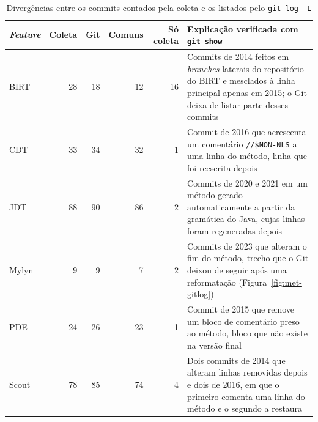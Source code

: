 \begin{table}[htbp]
    \centering
    \footnotesize
    \renewcommand{\arraystretch}{1.25}
    \caption{Divergências entre os commits contados pela coleta e os listados pelo \texttt{git log -L}}
    \label{tab:met-conferencia}
    \begin{tabularx}{\linewidth}{@{}lrrrr>{\raggedright\arraybackslash}X@{}}
        \toprule
        \textit{Feature} & Coleta & Git & Comuns & Só coleta & Explicação verificada com \texttt{git show} \\
        \midrule
        BIRT & 28 & 18 & 12 & 16 & Commits de 2014 feitos em \textit{branches} laterais do repositório do BIRT e mesclados à linha principal apenas em 2015; o Git deixa de listar parte desses commits \\
        CDT & 33 & 34 & 32 & 1 & Commit de 2016 que acrescenta um comentário \texttt{//\$NON-NLS} a uma linha do método, linha que foi reescrita depois \\
        JDT & 88 & 90 & 86 & 2 & Commits de 2020 e 2021 em um método gerado automaticamente a partir da gramática do Java, cujas linhas foram regeneradas depois \\
        Mylyn & 9 & 9 & 7 & 2 & Commits de 2023 que alteram o fim do método, trecho que o Git deixou de seguir após uma reformatação (Figura~\ref{fig:met-gitlog}) \\
        PDE & 24 & 26 & 23 & 1 & Commit de 2015 que remove um bloco de comentário preso ao método, bloco que não existe na versão final \\
        Scout & 78 & 85 & 74 & 4 & Dois commits de 2014 que alteram linhas removidas depois e dois de 2016, em que o primeiro comenta uma linha do método e o segundo a restaura \\
        \bottomrule
    \end{tabularx}
\end{table}%
